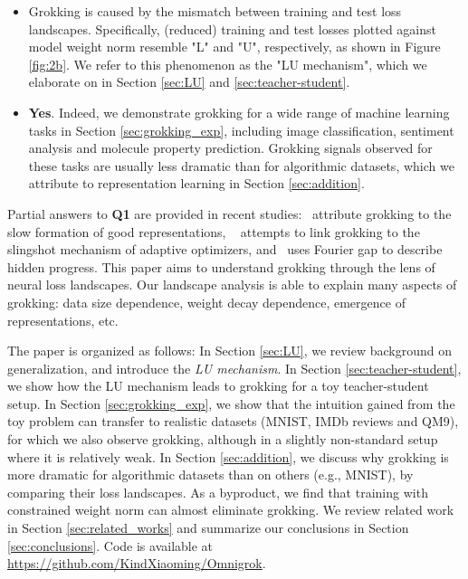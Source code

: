 \documentclass{article} %
\begin{document}
\begin{itemize}
  \item[\bf A1] Grokking is caused by the mismatch between training and test loss landscapes. Specifically, (reduced) training and test losses plotted against model weight norm resemble "L" and "U", respectively, as shown in Figure \ref{fig:2b}. We refer to this phenomenon as the "LU mechanism", which we elaborate on in Section \ref{sec:LU} and \ref{sec:teacher-student}.
  \item[\bf A2] {\bf Yes}. Indeed, we demonstrate grokking for a wide range of machine learning tasks in Section \ref{sec:grokking_exp}, including image classification, sentiment analysis and molecule property prediction. Grokking signals observed for these tasks are usually less dramatic than for algorithmic datasets, which we attribute to representation learning in Section \ref{sec:addition}.
\end{itemize}


Partial answers to {\bf Q1} are provided in recent studies:~\cite{liu2022towards} attribute grokking to the slow formation of good representations, ~\cite{thilak2022slingshot} attempts to link grokking to the slingshot mechanism of adaptive optimizers, and~\cite{barak2022hidden} uses Fourier gap to describe hidden progress. This paper aims to understand grokking through the lens of neural loss landscapes. Our landscape analysis is able to explain many aspects of grokking: data size dependence, weight decay dependence, emergence of representations, etc.

The paper is organized as follows: In Section \ref{sec:LU}, we review background on generalization, and introduce the {\it LU mechanism}.  %
In Section \ref{sec:teacher-student}, we show how the LU mechanism leads to grokking for a toy teacher-student setup. In Section \ref{sec:grokking_exp}, we show that the intuition gained from the toy problem can transfer to realistic datasets (MNIST, IMDb reviews and QM9), for which we also observe grokking, although in a slightly non-standard setup where it is relatively weak. In Section \ref{sec:addition}, we discuss why grokking is more dramatic for algorithmic datasets than on others (e.g., MNIST), by comparing their loss landscapes. As a byproduct, we find that training with constrained weight norm can almost eliminate grokking. We review related work in Section \ref{sec:related_works} and summarize our conclusions in Section \ref{sec:conclusions}. Code is available at \url{https://github.com/KindXiaoming/Omnigrok}.
\end{document}
